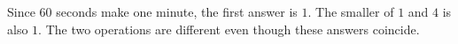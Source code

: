 Since $60$ seconds make one minute, the first answer is $1$. The smaller of $1$ and $4$ is also $1$. The two operations are different even though these answers coincide.
